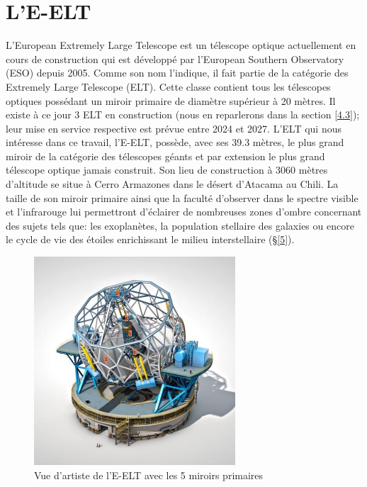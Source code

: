 

\chapter{L'E-ELT}\label{4}

L'European Extremely Large Telescope est un télescope optique actuellement en cours de construction qui est développé par l'European Southern Observatory (ESO) depuis 2005. Comme son nom l'indique, il fait partie de la catégorie des Extremely Large Telescope (ELT). Cette classe contient tous les télescopes optiques possédant un miroir primaire de diamètre supérieur à 20 mètres. Il existe à ce jour 3 ELT en construction (nous en reparlerons dans la section \ref{4.3}); leur mise en service respective est prévue entre 2024 et 2027. L'ELT qui nous intéresse dans ce travail, l'E-ELT, possède, avec ses 39.3 mètres, le plus grand miroir de la catégorie des télescopes géants et par extension le plus grand télescope optique jamais construit. Son lieu de construction à 3060 mètres d'altitude se situe à Cerro Armazones dans le désert d'Atacama au Chili. La taille de son miroir primaire ainsi que la faculté d'observer dans le spectre visible et l'infrarouge lui permettront d'éclairer de nombreuses zones d'ombre concernant des sujets tels que: les exoplanètes, la population stellaire des galaxies ou encore le cycle de vie des étoiles enrichissant le milieu interstellaire (§\ref{5}).

\begin{figure}[H]
	\centering
	\includegraphics[scale=1.35]{images/e-elt_i}
	\caption[Vue d'artiste de l'E-ELT avec les 5 miroirs primaires \label{Fig. 4.1}]{Vue d'artiste de l'E-ELT avec les 5 miroirs primaires}
	\label{Fig. 4.1}
\end{figure}

